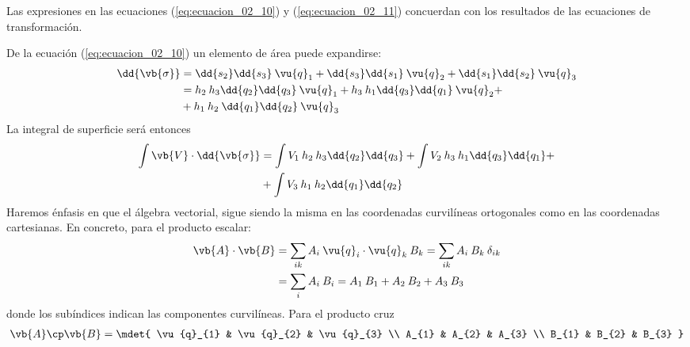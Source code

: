 Las expresiones en las ecuaciones (\ref{eq:ecuacion_02_10}) y (\ref{eq:ecuacion_02_11}) concuerdan con los resultados de las ecuaciones de transformación.
\par
De la ecuación (\ref{eq:ecuacion_02_10}) un elemento de área puede expandirse:
\begin{align*}
\dd{\vb{\sigma}} &= \dd{s_{2}} \dd{s_{3}} \: \vu{q}_{1} + \dd{s_{3}} \dd{s_{1}} \: \vu{q}_{2} + \dd{s_{1}} \dd{s_{2}} \: \vu{q}_{3} \\
&= h_{2} \: h_{3} \dd{q_{2}} \dd{q_{3}} \: \vu{q}_{1} + h_{3} \: h_{1} \dd{q_{3}} \dd{q_{1}} \: \vu{q}_{2} + \\
&+ h_{1} \: h_{2} \: \dd{q_{1}} \dd{q_{2}} \: \vu{q}_{3}
\end{align*}
La integral de superficie será entonces
\begin{align*}
\int \vb{V} \cdot \dd{\vb{\sigma}} &= \int V_{1} \: h_{2} \: h_{3} \dd{q_{2}} \dd{q_{3}} + \int V_{2} \: h_{3} \: h_{1} \dd{q_{3}} \dd{q_{1}} + \\
&+ \int V_{3} \: h_{1} \: h_{2} \dd{q_{1}} \dd{q_{2}}
\end{align*}
Haremos énfasis en que el álgebra vectorial, sigue siendo la misma en las coordenadas curvilíneas ortogonales como en las coordenadas cartesianas. En concreto, para el producto escalar:
\begin{align}
\begin{aligned}
\vb{A} \cdot \vb{B} &= \sum_{ik} A_{i} \: \vu{q}_{i} \cdot \vu{q}_{k} \: B_{k} = \sum_{ik} A_{i} \: B_{k} \: \delta_{ik} \\
&= \sum_{i} A_{i} \: B_{i} = A_{1} \: B_{1} + A_{2} \: B_{2} + A_{3} \: B_{3}
\end{aligned}
\label{eq:ecuacion_02_12}
\end{align}
donde los subíndices indican las componentes curvilíneas. Para el producto cruz
\begin{align}
\vb{A} \cp \vb{B} = \mdet{
\vu{q}_{1} & \vu{q}_{2} & \vu{q}_{3} \\
A_{1} & A_{2} & A_{3} \\
B_{1} & B_{2} & B_{3}
}
\label{eq:ecuacion_02_13}
\end{align}

